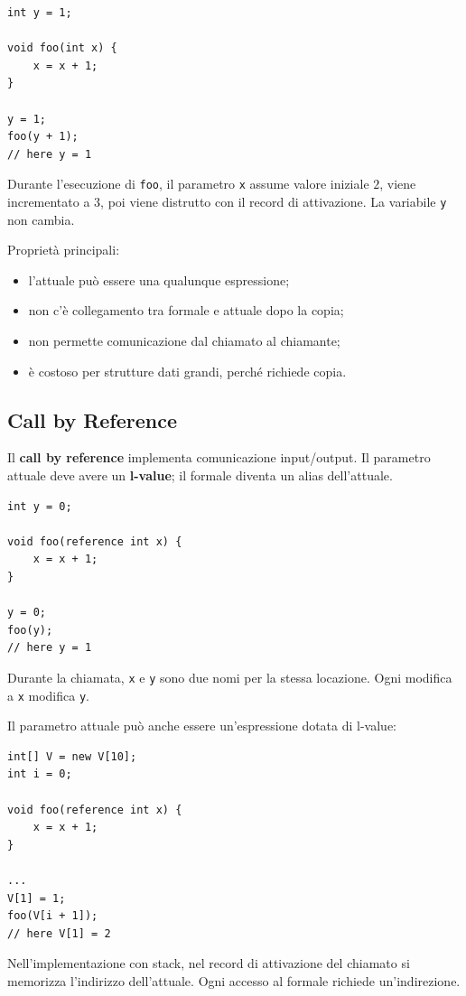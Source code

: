 \documentclass{article}
\begin{document}
\begin{lstlisting}
int y = 1;

void foo(int x) {
    x = x + 1;
}

y = 1;
foo(y + 1);
// here y = 1
\end{lstlisting}

Durante l'esecuzione di \texttt{foo}, il parametro \texttt{x} assume valore iniziale $2$, viene incrementato a $3$, poi viene distrutto con il record di attivazione. La variabile \texttt{y} non cambia.

Proprietà principali:
\begin{itemize}
  \item l'attuale può essere una qualunque espressione;
  \item non c'è collegamento tra formale e attuale dopo la copia;
  \item non permette comunicazione dal chiamato al chiamante;
  \item è costoso per strutture dati grandi, perché richiede copia.
\end{itemize}

\subsection{Call by Reference}

Il \textbf{call by reference} implementa comunicazione input/output. Il parametro attuale deve avere un \textbf{l-value}; il formale diventa un alias dell'attuale.

\begin{lstlisting}
int y = 0;

void foo(reference int x) {
    x = x + 1;
}

y = 0;
foo(y);
// here y = 1
\end{lstlisting}

Durante la chiamata, \texttt{x} e \texttt{y} sono due nomi per la stessa locazione. Ogni modifica a \texttt{x} modifica \texttt{y}.

Il parametro attuale può anche essere un'espressione dotata di l-value:

\begin{lstlisting}
int[] V = new V[10];
int i = 0;

void foo(reference int x) {
    x = x + 1;
}

...
V[1] = 1;
foo(V[i + 1]);
// here V[1] = 2
\end{lstlisting}

Nell'implementazione con stack, nel record di attivazione del chiamato si memorizza l'indirizzo dell'attuale. Ogni accesso al formale richiede un'indirezione.
\end{document}
